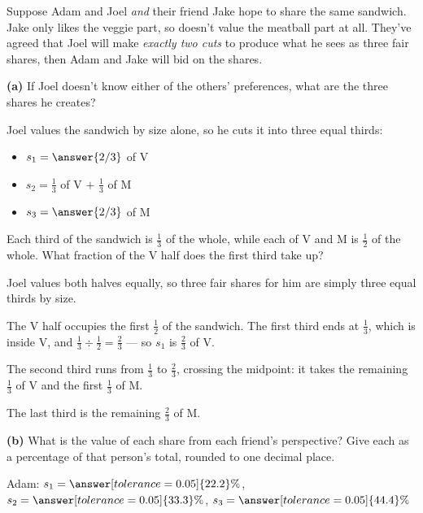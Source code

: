 \documentclass[12pt]{ximera}
\begin{document}
\begin{problem}
Suppose Adam and Joel \emph{and} their friend Jake hope to share the same sandwich.
Jake only likes the veggie part, so doesn't value the meatball part at all. They've
agreed that Joel will make \emph{exactly two cuts} to produce what he sees as three
fair shares, then Adam and Jake will bid on the shares.

\begin{prompt}
\textbf{(a)} If Joel doesn't know either of the others' preferences, what are the three
shares he creates?

Joel values the sandwich by size alone, so he cuts it into three equal thirds:
\begin{itemize}
\item $s_1 = \answer{2/3}$ of V
\item $s_2 = \frac13$ of V $+$ $\frac13$ of M
\item $s_3 = \answer{2/3}$ of M
\end{itemize}

\begin{hint}
Each third of the sandwich is $\frac13$ of the whole, while each of V and M is
$\frac12$ of the whole. What fraction of the V half does the first third take up?
\end{hint}

\begin{feedback}
Joel values both halves equally, so three fair shares for him are simply three equal
thirds by size.

The V half occupies the first $\frac12$ of the sandwich. The first third ends at
$\frac13$, which is inside V, and $\frac13 \div \frac12 = \frac23$ --- so
$s_1$ is $\frac23$ of V.

The second third runs from $\frac13$ to $\frac23$, crossing the midpoint: it takes the
remaining $\frac13$ of V and the first $\frac13$ of M.

The last third is the remaining $\frac23$ of M.
\end{feedback}
\end{prompt}

\begin{prompt}
\textbf{(b)} What is the value of each share from each friend's perspective? Give each
as a percentage of that person's total, rounded to one decimal place.

Adam: $s_1 = \answer[tolerance=0.05]{22.2}\%$, \quad
$s_2 = \answer[tolerance=0.05]{33.3}\%$, \quad
$s_3 = \answer[tolerance=0.05]{44.4}\%$


\end{prompt}
\end{problem}
\end{document}
